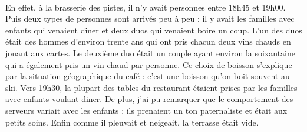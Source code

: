 \paragraph{}
En effet, à la brasserie des pistes, il n’y avait personnes entre 18h45 et 19h00. Puis deux types de personnes sont arrivés peu à peu : il y avait les familles avec enfants qui venaient diner et deux duos qui venaient boire un coup. L’un des duos était des hommes d’environ trente ans qui ont pris chacun deux vins chauds en jouant aux cartes. Le deuxième duo était un couple ayant environ la soixantaine qui a également pris un vin chaud par personne. Ce choix de boisson s’explique par la situation géographique du café : c’est une boisson qu’on boit souvent au ski. Vers 19h30, la plupart des tables du restaurant étaient prises par les familles avec enfants voulant diner. De plus, j’ai pu remarquer que le comportement des serveurs variait avec les enfants : ils prenaient un ton paternaliste et était aux petits soins. Enfin comme il pleuvait et neigeait, la terrasse était vide.

